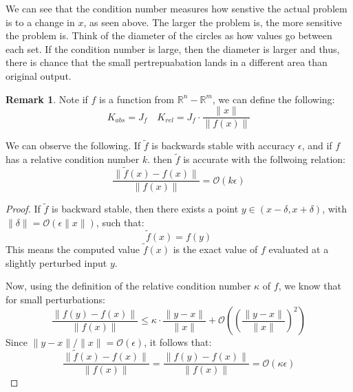 \documentclass[11pt]{article}
\theoremstyle{definition}
\newtheorem{remark}{Remark}[section]
\newcommand{\R}{\mathbb{R}}
\begin{document}
\begin{center}
\end{center}
We can see that the condition number measures how senstive the actual problem is to a change in $x$, as seen above. The larger the problem is, the more sensitive the problem is. Think of the diameter of the circles as how values go between each set. If the condition number is large, then the diameter is larger and thus, there is chance that the small pertrepuabation lands in a different area than original output. 
\begin{remark}
  Note if $f$ is a function from $\R^n - \R^m$, we can define the following:
  \[
  K_{abs} = J_f \quad K_{rel} = J_f \cdot \frac{\|x\|}{\|f(x)\|}
  \]
\end{remark}


We can observe the following. If $\tilde{f}$ is backwards stable with accuracy $\epsilon$, and if $f$ has a relative condition number $k$. then $\tilde{f}$ is accurate with the follwoing relation:
\[
\frac{\| \tilde{f}(x) - f(x) \|}{\|f(x)\|} = \mathcal{O}(k \epsilon)
\]
\begin{proof}

  If \( \tilde{f} \) is backward stable, then there exists a point \( y \in (x - \delta, x + \delta) \), with \( \|\delta\| = \mathcal{O}(\epsilon \|x\|) \), such that:
  \[
  \tilde{f}(x) = f(y)
  \]
  This means the computed value \( \tilde{f}(x) \) is the exact value of \( f \) evaluated at a slightly perturbed input \( y \).
  
  Now, using the definition of the relative condition number \( \kappa \) of \( f \), we know that for small perturbations:
  \[
  \frac{\|f(y) - f(x)\|}{\|f(x)\|} \leq \kappa \cdot \frac{\|y - x\|}{\|x\|} + \mathcal{O}\left(\left(\frac{\|y - x\|}{\|x\|}\right)^2\right)
  \]
  Since \( \|y - x\| / \|x\| = \mathcal{O}(\epsilon) \), it follows that:
  \[
  \frac{\|\tilde{f}(x) - f(x)\|}{\|f(x)\|} 
  = \frac{\|f(y) - f(x)\|}{\|f(x)\|} 
  = \mathcal{O}(\kappa \epsilon)
  \]
\end{proof}
\end{document}
